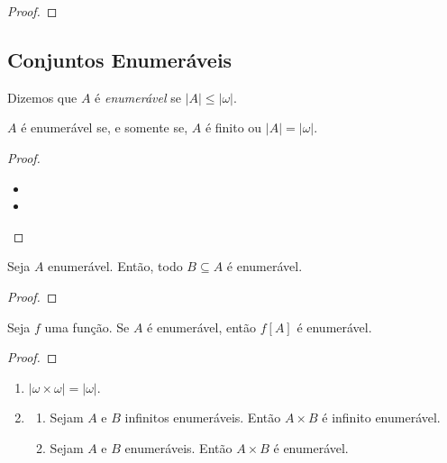 \begin{proof} 
    \blackproof
\end{proof}

\subsection{Conjuntos Enumeráveis}

\begin{definition}
    Dizemos que $A$ é \emph{enumerável} se $|A| \leq |\omega|$.
\end{definition}

\begin{proposition} 
    $A$ é enumerável se, e somente se, $A$ é finito ou $|A| = |\omega|$.
\end{proposition}

\begin{proof} 
    \leavevmode
        \begin{itemize}[align=left]
            \item[($\Rightarrow$)]
            \item[($\Leftarrow$)]  
        \end{itemize}
\end{proof}

\begin{theorem} 
    Seja $A$ enumerável. Então, todo $B \subseteq A$ é enumerável.
\end{theorem}

\begin{proof}
    \blackproof
\end{proof}

\begin{proposition} 
    Seja $f$ uma função. Se $A$ é enumerável, então $f[A]$ é enumerável.
\end{proposition}

\begin{proof}
    \blackproof
\end{proof}

\begin{theorem}
    \leavevmode
        \begin{enumerate}[leftmargin=*, align=left, label=\textbf{(\alph*)}]
            \item {}
                $|\omega \times \omega| = |\omega|$.
            \item 
                \begin{enumerate}[label=\roman*.]
                    \item {}
                        Sejam $A$ e $B$ infinitos enumeráveis. Então $A \times B$ é infinito enumerável.
                    \item {}
                        Sejam $A$ e $B$ enumeráveis. Então $A \times B$ é enumerável.
                \end{enumerate}
        \end{enumerate}
\end{theorem}

